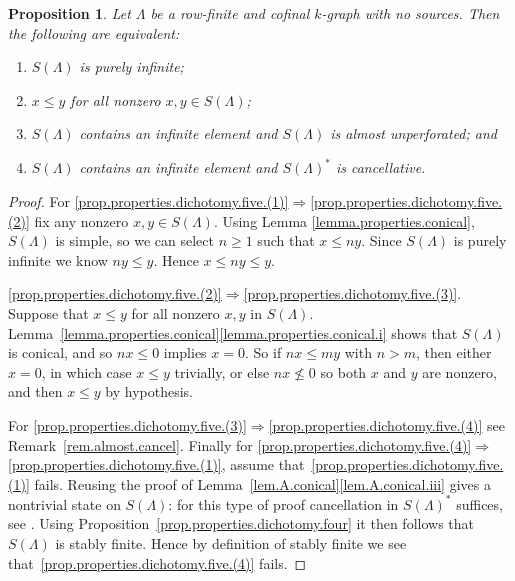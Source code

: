 \documentclass[a4paper, 12pt]{amsart}
\numberwithin{equation}{section}
\newcounter{theorem}
\newtheorem{prop}[theorem]{Proposition}
\theoremstyle{remark}
\theoremstyle{definition}
\begin{document}
\begin{prop}\label{prop.properties.dichotomy.five}
Let $\Lambda$ be a row-finite and cofinal $k$-graph with no sources. Then the following are equivalent:\begin{enumerate}
\item\label{prop.properties.dichotomy.five.(1)} $S(\Lambda)$ is purely infinite;
\item\label{prop.properties.dichotomy.five.(2)}  $x\leq y$ for all nonzero $x,y\in S(\Lambda)$;
\item\label{prop.properties.dichotomy.five.(3)}  $S(\Lambda)$ contains an infinite element and $S(\Lambda)$ is almost
    unperforated; and
\item\label{prop.properties.dichotomy.five.(4)}  $S(\Lambda)$ contains an infinite element and $S(\Lambda)^*$ is
    cancellative.
\end{enumerate}
\end{prop}
\begin{proof}
For \eqref{prop.properties.dichotomy.five.(1)}$\Rightarrow$\eqref{prop.properties.dichotomy.five.(2)} fix any nonzero $x,y\in S(\Lambda)$. Using Lemma
\ref{lemma.properties.conical}, $S(\Lambda)$ is simple, so we can select $n\geq 1$ such
that $x\leq ny$. Since $S(\Lambda)$ is purely infinite we know $ny \leq y$. Hence $x \leq
ny \leq y$.

\eqref{prop.properties.dichotomy.five.(2)}$\Rightarrow$\eqref{prop.properties.dichotomy.five.(3)}. Suppose that $x \leq y$ for all nonzero $x, y$ in $S(\Lambda)$.
Lemma~\ref{lemma.properties.conical}\eqref{lemma.properties.conical.i} shows that $S(\Lambda)$ is conical, and so $nx
\le 0$ implies $x = 0$. So if $nx \le my$ with $n > m$, then either $x = 0$, in which
case $x \le y$ trivially, or else $nx \not\le 0$ so both $x$ and $y$ are nonzero, and
then $x \le y$ by hypothesis.

For \eqref{prop.properties.dichotomy.five.(3)}$\Rightarrow$\eqref{prop.properties.dichotomy.five.(4)} see Remark~\ref{rem.almost.cancel}.
Finally for \eqref{prop.properties.dichotomy.five.(4)}$\Rightarrow$\eqref{prop.properties.dichotomy.five.(1)}, assume that~\eqref{prop.properties.dichotomy.five.(1)} fails. Reusing the proof of
Lemma~\ref{lem.A.conical}\eqref{lem.A.conical.iii} gives a nontrivial state on $S(\Lambda)$: for this type of
proof cancellation in $S(\Lambda)^*$ suffices, see \cite[p.~95]{Sie}. Using
Proposition~\ref{prop.properties.dichotomy.four} it then follows that $S(\Lambda)$ is
stably finite. Hence by definition of stably finite we see that~\eqref{prop.properties.dichotomy.five.(4)} fails.
\end{proof}
\end{document}
